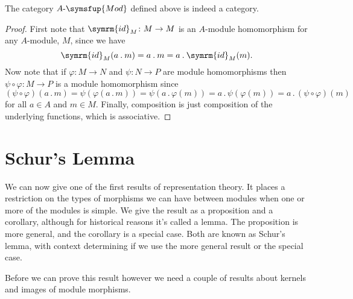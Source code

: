 \documentclass[fleqn]{NotesClass}
\makeatletter
\newcommand{\id}{\symrm{id}}
\newcommand{\action}{\mathbin{.}}
\newcommand{\c@egory}[1]{\symsfup{#1}}
\newcommand{\AMod}[1][A]{#1\text{-}\c@egory{Mod}}
\makeatother
\begin{document}
    \begin{lma}{}{}
        The category \(\AMod\) defined above is indeed a category.
        \begin{proof}
            First note that \(\id_M \colon M \to M\) is an \(A\)-module homomorphism for any \(A\)-module, \(M\), since we have
            \begin{equation}
                \id_M(a \action m) = a \action m = a \action \id_M(m).
            \end{equation}
            Now note that if \(\varphi \colon M \to N\) and \(\psi \colon N \to P\) are module homomorphisms then \(\psi \circ \varphi \colon M \to P\) is a module homomorphism since
            \begin{equation*}
                (\psi \circ \varphi)(a \action m) = \psi(\varphi(a \action m)) = \psi(a \action \varphi(m)) = a \action \psi(\varphi(m)) = a \action (\psi \circ \varphi)(m)
            \end{equation*}
            for all \(a \in A\) and \(m \in M\).
            Finally, composition is just composition of the underlying functions, which is associative.
        \end{proof}
    \end{lma}
    
    \section{Schur's Lemma}
    We can now give one of the first results of representation theory.
    It places a restriction on the types of morphisms we can have between modules when one or more of the modules is simple.
    We give the result as a proposition and a corollary, although for historical reasons it's called a lemma.
    The proposition is more general, and the corollary is a special case.
    Both are known as Schur's lemma, with context determining if we use the more general result or the special case.
    
    Before we can prove this result however we need a couple of results about kernels and images of module morphisms.
    
\end{document}
